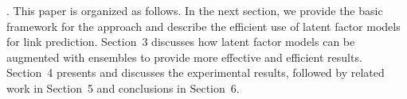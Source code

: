 . This paper is organized as follows. In the next section, we  provide
the basic framework for the approach and describe the efficient use
of  latent factor models for link prediction. Section~3 discusses
how latent factor models can be augmented with ensembles to provide
more effective and efficient results. Section~4 presents and discusses the
experimental results, followed by related work in Section~5 and conclusions in Section~6.


